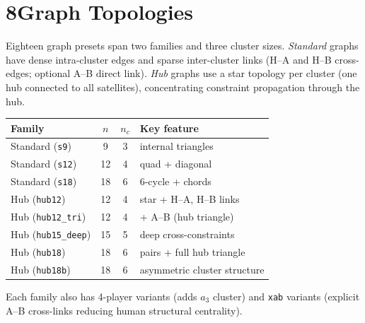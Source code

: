 \documentclass[9pt,twocolumn]{article}
\begin{document}
\section*{8\quad Graph Topologies}

Eighteen graph presets span two families and three cluster sizes.
\emph{Standard} graphs have dense intra-cluster edges and sparse inter-cluster links
(H--A and H--B cross-edges; optional A--B direct link).
\emph{Hub} graphs use a star topology per cluster (one hub connected to all satellites),
concentrating constraint propagation through the hub.

\begin{center}
\small
\begin{tabular}{lccl}
\toprule
\textbf{Family} & $n$ & $n_c$ & \textbf{Key feature} \\
\midrule
Standard (\texttt{s9}) & 9 & 3 & internal triangles \\
Standard (\texttt{s12}) & 12 & 4 & quad + diagonal \\
Standard (\texttt{s18}) & 18 & 6 & 6-cycle + chords \\
Hub (\texttt{hub12}) & 12 & 4 & star + H--A, H--B links \\
Hub (\texttt{hub12\_tri}) & 12 & 4 & + A--B (hub triangle) \\
Hub (\texttt{hub15\_deep}) & 15 & 5 & deep cross-constraints \\
Hub (\texttt{hub18}) & 18 & 6 & pairs + full hub triangle \\
Hub (\texttt{hub18b}) & 18 & 6 & asymmetric cluster structure \\
\bottomrule
\end{tabular}
\end{center}

\noindent Each family also has 4-player variants (adds $a_3$ cluster) and
\texttt{xab} variants (explicit A--B cross-links reducing human structural centrality).
\end{document}
